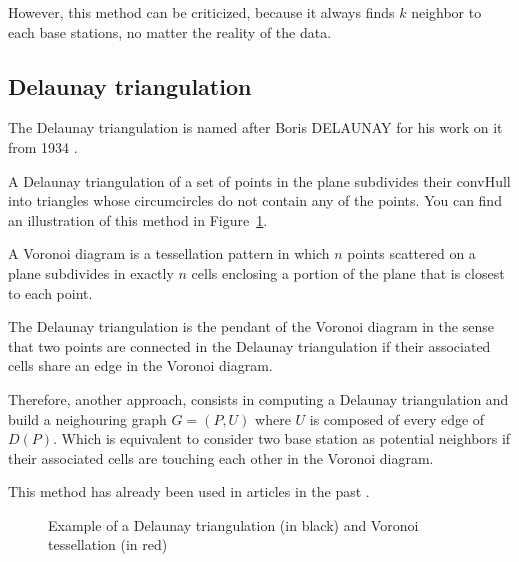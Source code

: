 \documentclass[lettersize,journal,english]{IEEEtran}
\begin{document}
However, this method can be criticized, because it always finds $k$ neighbor to each base stations, no matter the reality of the 
data.

\subsection{Delaunay triangulation}
\noindent The Delaunay triangulation is named after Boris DELAUNAY for his work on it from 1934 \cite{art_delaunay}.

A Delaunay triangulation of a set of points in the plane subdivides their \gls{convHull} into triangles whose circumcircles 
do not contain any of the points. You can find an illustration of this method in Figure~\ref{fig:del_tri}.

A Voronoi diagram is a tessellation pattern in which $n$ points scattered on a plane subdivides in 
exactly $n$ cells enclosing a portion of the plane that is closest to each point. 

The Delaunay triangulation is the pendant of the Voronoi diagram in the sense that two points are connected in the
Delaunay triangulation if their associated cells share an edge in the Voronoi diagram. 

Therefore, another approach, consists in computing a Delaunay triangulation and build a neighouring graph $G = (P, U)$ where $U$ 
is composed of every edge of $D(P)$. Which is equivalent to consider two base station as potential neighbors if their associated
cells are touching each other in the Voronoi diagram.

This method has already been used in articles in the past \cite{delaunay_neighbor}.


\begin{figure}[!t]
    \centering
    \caption{Example of a Delaunay triangulation (in black) and Voronoi tessellation (in red)}
    \label{fig:del_tri}
\end{figure}
\end{document}
